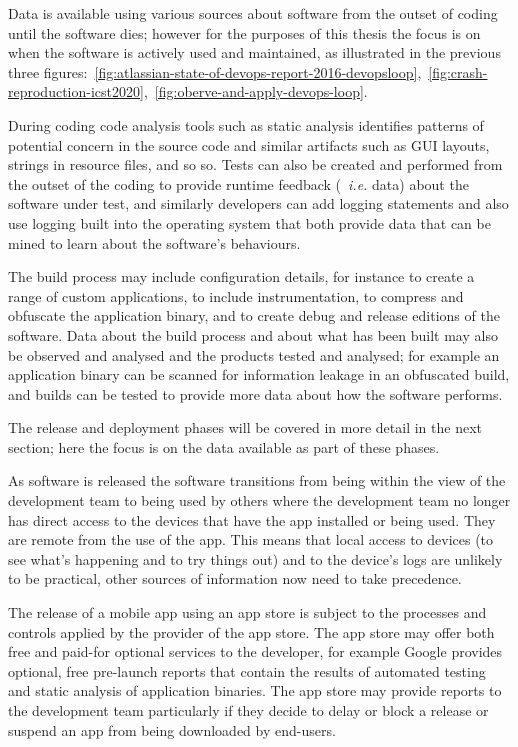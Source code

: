 Data is available using various sources about software from the outset of coding until the software dies; however for the purposes of this thesis the focus is on when the software is actively used and maintained, as illustrated in the previous three figures:~\ref{fig:atlassian-state-of-devops-report-2016-devopsloop},~\ref{fig:crash-reproduction-icst2020},~\ref{fig:oberve-and-apply-devops-loop}. 

During coding code analysis tools such as static analysis identifies patterns of potential concern in the source code and similar artifacts such as GUI layouts, strings in resource files, and so so. Tests can also be created and performed from the outset of the coding to provide runtime feedback (~\emph{i.e.} data) about the software under test, and similarly developers can add logging statements and also use logging built into the operating system that both provide data that can be mined to learn about the software's behaviours.

The build process may include configuration details, for instance to create a range of custom applications, to include instrumentation, to compress and obfuscate the application binary, and to create debug and release editions of the software. Data about the build process and about what has been built may also be observed and analysed and the products tested and analysed; for example an application binary can be scanned for information leakage in an obfuscated build, and builds can be tested to provide more data about how the software performs.

The release and deployment phases will be covered in more detail in the next section; here the focus is on the data available as part of these phases. 

As software is released the software transitions from being within the view of the development team to being used by others where the development team no longer has direct access to the devices that have the app installed or being used. They are remote from the use of the app. This means that local access to devices (to see what's happening and to try things out) and to the device's logs are unlikely to be practical, other sources of information now need to take precedence.

The release of a mobile app using an app store is subject to the processes and controls applied by the provider of the app store. The app store may offer both free and paid-for optional services to the developer, for example Google provides optional, free pre-launch reports that contain the results of automated testing and static analysis of application binaries. The app store may provide reports to the development team particularly if they decide to delay or block a release or suspend an app from being downloaded by end-users.

